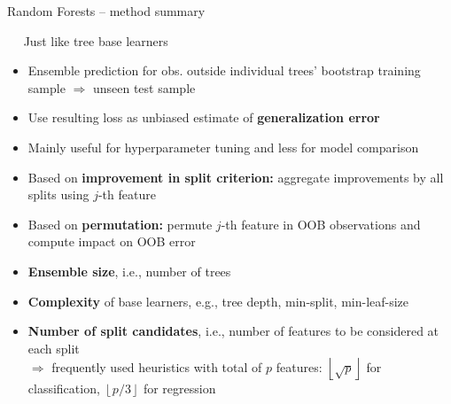 \begin{frame}{Random Forests -- method summary}

 ~~ Just like tree base learners

\medskip

\begin{itemize}
  \item Ensemble prediction for obs. outside individual trees' bootstrap training sample $\Rightarrow$ unseen test sample
  \item Use resulting loss as unbiased estimate of \textbf{generalization error}
  \item Mainly useful for hyperparameter tuning and less for model comparison
\end{itemize}

\medskip


\begin{itemize}
  \item Based on \textbf{improvement in split criterion:} aggregate improvements 
  by all splits using $j$-th feature
  \item Based on \textbf{permutation:} permute $j$-th feature in 
  OOB observations and compute impact on OOB error
\end{itemize}

\medskip


\begin{itemize}
  \item \textbf{Ensemble size}, i.e., number of trees
  \item \textbf{Complexity} of base learners, e.g., tree depth, min-split, min-leaf-size
  \item \textbf{Number of split candidates}, i.e., number of features to be considered at each split \\
  $\Rightarrow$ frequently used heuristics with total of $p$ features: 
  $\left \lfloor{\sqrt{p}}\right \rfloor$ for classification, $\left \lfloor{p/3}\right \rfloor$ for regression
\end{itemize}

  
\end{frame}



